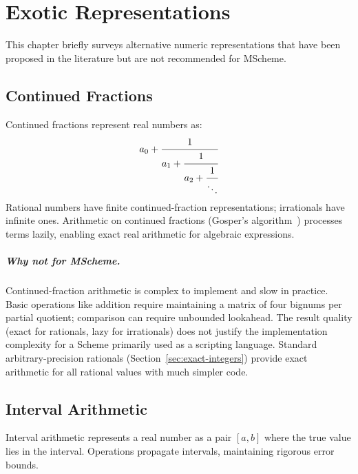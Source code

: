 \documentclass[12pt]{report}
\begin{document}
\chapter{Exotic Representations}
\label{ch:exotic}

This chapter briefly surveys alternative numeric representations
that have been proposed in the literature but are not recommended
for MScheme.

\section{Continued Fractions}

Continued fractions represent real numbers as:
\[
  a_0 + \cfrac{1}{a_1 + \cfrac{1}{a_2 + \cfrac{1}{\ddots}}}
\]
Rational numbers have finite continued-fraction representations;
irrationals have infinite ones.  Arithmetic on continued fractions
(Gosper's algorithm~\cite{gosper}) processes terms lazily, enabling
exact real arithmetic for algebraic expressions.

\paragraph{Why not for MScheme.}
Continued-fraction arithmetic is complex to implement and slow
in practice.  Basic operations like addition require maintaining
a matrix of four bignums per partial quotient; comparison can require
unbounded lookahead.  The result quality (exact for rationals, lazy
for irrationals) does not justify the implementation complexity for
a Scheme primarily used as a scripting language.  Standard
arbitrary-precision rationals (Section~\ref{sec:exact-integers})
provide exact arithmetic for all rational values with much simpler
code.

\section{Interval Arithmetic}

Interval arithmetic represents a real number as a pair $[a, b]$
where the true value lies in the interval.  Operations propagate
intervals, maintaining rigorous error bounds.
\end{document}
